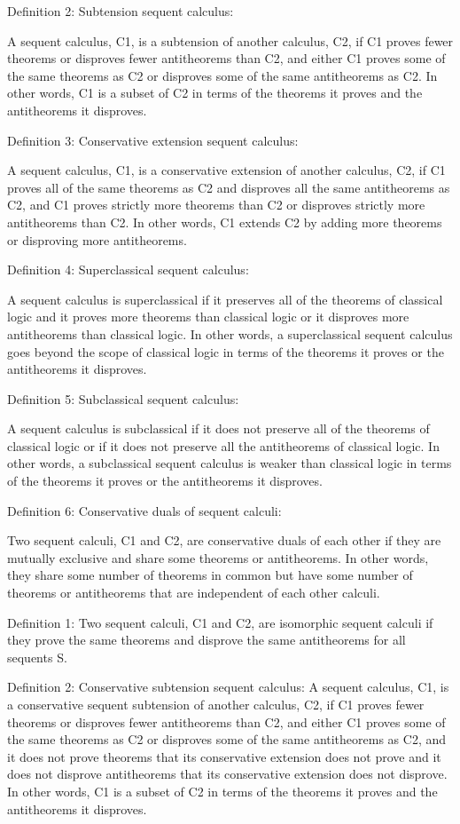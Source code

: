 Definition 2: Subtension sequent calculus:

A sequent calculus, C1, is a subtension of another calculus, C2, if C1 proves fewer theorems or disproves fewer antitheorems than C2, and either C1 proves some of the same theorems as C2 or disproves some of the same antitheorems as C2. In other words, C1 is a subset of C2 in terms of the theorems it proves and the antitheorems it disproves.

Definition 3: Conservative extension sequent calculus:

A sequent calculus, C1, is a conservative extension of another calculus, C2, if C1 proves all of the same theorems as C2 and disproves all the same antitheorems as C2, and C1 proves strictly more theorems than C2 or disproves strictly more antitheorems than C2. In other words, C1 extends C2 by adding more theorems or disproving more antitheorems.

Definition 4: Superclassical sequent calculus:

A sequent calculus is superclassical if it preserves all of the theorems of classical logic and it proves more theorems than classical logic or it disproves more antitheorems than classical logic. In other words, a superclassical sequent calculus goes beyond the scope of classical logic in terms of the theorems it proves or the antitheorems it disproves.

Definition 5: Subclassical sequent calculus:

A sequent calculus is subclassical if it does not preserve all of the theorems of classical logic or if it does not preserve all the antitheorems of classical logic. In other words, a subclassical sequent calculus is weaker than classical logic in terms of the theorems it proves or the antitheorems it disproves.

Definition 6: Conservative duals of sequent calculi:

Two sequent calculi, C1 and C2, are conservative duals of each other if they are mutually exclusive and share some theorems or antitheorems. In other words, they share some number of theorems in common but have some number of theorems or antitheorems that are independent of each other calculi.

Definition 1:
Two sequent calculi, C1 and C2, are isomorphic sequent calculi if they prove the same theorems and disprove the same antitheorems for all sequents S.

Definition 2: Conservative subtension sequent calculus:
A sequent calculus, C1, is a conservative sequent subtension of another calculus, C2, if C1 proves fewer theorems or disproves fewer antitheorems than C2, and either C1 proves some of the same theorems as C2 or disproves some of the same antitheorems as C2, and it does not prove theorems that its conservative extension does not prove and it does not disprove antitheorems that its conservative extension does not disprove. In other words, C1 is a subset of C2 in terms of the theorems it proves and the antitheorems it disproves.

